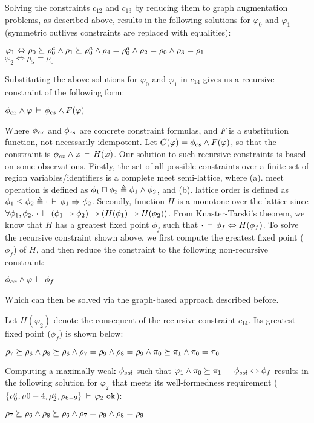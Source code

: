 Solving the constraints $c_{12}$ and $c_{13}$ by reducing them to
graph augmentation problems, as described above, results in the
following solutions for $\varphi_0$ and $\varphi_1$ (symmetric
outlives constraints are replaced with equalities):
\begin{center}
\(
  \varphi_1 \Leftrightarrow \rho_0 \succeq \rho^a_0 \wedge \rho_1
     \succeq \rho^a_0 \wedge \rho_4 = \rho^a_0 \wedge 
     \rho_2 = \rho_0 \wedge \rho_3 = \rho_1
\)\\
\(
  \varphi_2 \Leftrightarrow \rho_5 = \rho_0
\)
\end{center}
Substituting the above solutions for $\varphi_0$ and $\varphi_1$ in
$c_{14}$ gives us a recursive constraint of the following form:
\begin{center}
\(
  \phi_{cx} \wedge \varphi\,\vdash\,\phi_{cs} \wedge F(\varphi)
\)
\end{center}
Where $\phi_{cx}$ and $\phi_{cs}$ are concrete constraint formulas, and
$F$ is a substitution function, not necessarily idempotent. Let
$G(\varphi) = \phi_{cs} \wedge F(\varphi)$, so that the constraint is
$\phi_{cx} \wedge \varphi\,\vdash\,H(\varphi)$. Our solution to such
recursive constraints  is based on some observations. Firstly, the set
of all possible constraints over a finite set of region
variables/identifiers is a complete meet semi-lattice, where (a).
meet operation is defined as $\phi_1 \sqcap \phi_2 \triangleq \phi_1
\wedge \phi_2$, and (b). lattice order is defined as $\phi_1 \le \phi_2
\triangleq \cdot\,\vdash\,\phi_1 \Rightarrow \phi_2$. Secondly,
function $H$ is a monotone over the lattice since $\forall
\phi_1,\phi_2.\; \cdot\,\vdash\,(\phi_1 \Rightarrow \phi_2)
\Rightarrow (H(\phi_1) \Rightarrow H(\phi_2))$. From Knaster-Tarski's
theorem, we know that $H$ has a greatest fixed point $\phi_f$ such
that $\cdot\,\vdash\,\phi_f \Leftrightarrow H(\phi_f)$. To solve
the recursive constraint shown above, we first compute the greatest
fixed point ($\phi_f$) of $H$, and then reduce the constraint to the
following non-recursive constraint:
\begin{center}
\(
  \phi_{cx} \wedge \varphi\,\vdash\,\phi_f
\)
\end{center}
Which can then be solved via the graph-based approach described
before.

Let $H(\varphi_2)$ denote the consequent of the recursive constraint
$c_{14}$. Its greatest fixed point ($\phi_f$) is shown below:
\begin{center}
\(
  \rho_7 \succeq \rho_6 \wedge \rho_8 \succeq \rho_6 \wedge \rho_7 =
  \rho_9 \wedge \rho_8 = \rho_9 \wedge \pi_0 \succeq \pi_1 \wedge
  \pi_0 = \pi_0
\)
\end{center}
Computing a maximally weak $\phi_{sol}$ such that $\varphi_1
\wedge \pi_0 \succeq \pi_1\,\vdash\,\phi_{sol} \Leftrightarrow \phi_f$
results in the following solution for $\varphi_2$ that meets its
well-formedness requirement ($\{\rho^a_0,\rho_{}0-4,
\rho^a_2, \rho_{6-9}\}\,\vdash\,\varphi_2 \; \texttt{ok} $):
\begin{center}
\(
  \rho_7 \succeq \rho_6 \wedge \rho_8 \succeq \rho_6 \wedge \rho_7 =
  \rho_9 \wedge \rho_8 = \rho_9
\)
\end{center}

